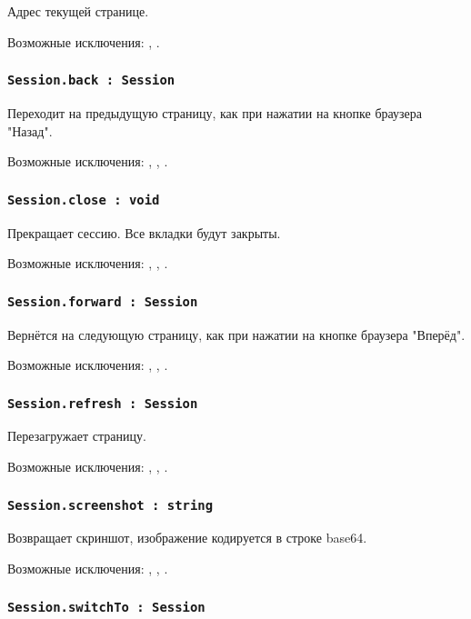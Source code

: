 Адрес текущей странице.

Возможные исключения: , .

\subsubsection{\lstinline|Session.back : Session|}

Переходит на предыдущую страницу, как при нажатии на кнопке браузера "Назад".

Возможные исключения: , , .

\subsubsection{\lstinline|Session.close : void|}

Прекращает сессию. Все вкладки будут закрыты.

Возможные исключения: , , .

\subsubsection{\lstinline|Session.forward : Session|}

Вернётся на следующую страницу, как при нажатии на кнопке браузера "Вперёд".

Возможные исключения: , , .

\subsubsection{\lstinline|Session.refresh : Session|}

Перезагружает страницу.

Возможные исключения: , , .

\subsubsection{\lstinline|Session.screenshot : string|}

Возвращает скриншот, изображение кодируется в строке base64.

Возможные исключения: , , .

\subsubsection{\lstinline|Session.switchTo : Session|}

